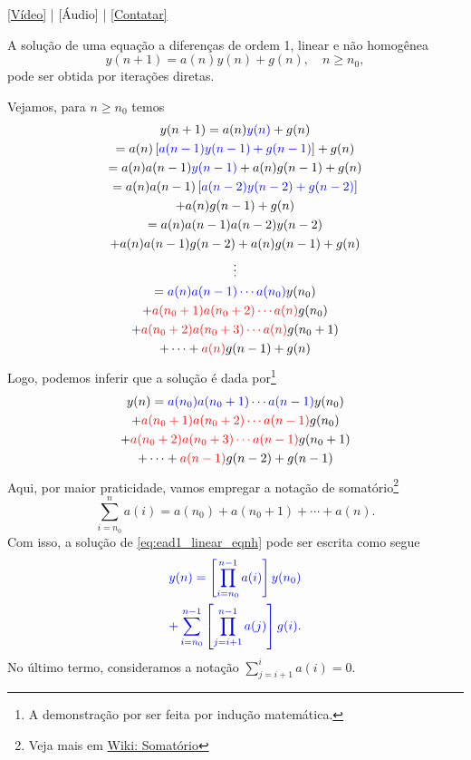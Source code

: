 \begin{flushright}
  \href{https://archive.org/details/ead-o1nh}{[Vídeo]} | [Áudio] | \href{https://phkonzen.github.io/notas/contato.html}{[Contatar]}
\end{flushright}

A solução de uma equação a diferenças de ordem 1, linear e não homogênea
\begin{equation}\label{eq:ead1_linear_eqnh}
  y(n+1) = a(n)y(n) + g(n),\quad n\geq n_0,
\end{equation}
pode ser obtida por iterações diretas.

Vejamos, para $n\geq n_0$ temos
\begin{gather}
  y(n+1) = a(n){\color{blue}y(n)} + g(n) \\
  = a(n)\left[{\color{blue}a(n-1)y(n-1)+g(n-1)}\right] + g(n) \\
  = a(n)a(n-1){\color{blue}y(n-1)}+a(n)g(n-1) + g(n) \\
  = a(n)a(n-1)\left[{\color{blue}a(n-2)y(n-2)+g(n-2)}\right] \nonumber\\
  + a(n)g(n-1) + g(n) \\
  = a(n)a(n-1)a(n-2)y(n-2) \nonumber\\
  + a(n)a(n-1)g(n-2) + a(n)g(n-1) + g(n) \\
  \vdots\nonumber\\
  = {\color{blue}a(n)a(n-1)\cdots a(n_0)}y(n_0) \nonumber\\
  + {\color{red}a(n_0+1)a(n_0+2)\cdots a(n)}g(n_0) \nonumber\\
  + {\color{red}a(n_0+2)a(n_0+3)\cdots a(n)}g(n_0+1) \nonumber\\
  + \cdots + {\color{red}a(n)}g(n-1) + g(n)
\end{gather}
Logo, podemos inferir que a solução é dada por\footnote{A demonstração por ser feita por indução matemática.}
\begin{gather}
  y(n) = {\color{blue}a(n_0)a(n_0+1)\cdots a(n-1)}y(n_0) \nonumber\\
  + {\color{red}a(n_0+1)a(n_0+2)\cdots a(n-1)}g(n_0) \nonumber\\
  + {\color{red}a(n_0+2)a(n_0+3)\cdots a(n-1)}g(n_0+1) \nonumber\\
  + \cdots + {\color{red}a(n-1)}g(n-2) + g(n-1)
\end{gather}
Aqui, por maior praticidade, vamos empregar a notação de somatório\footnote{Veja mais em \href{https://pt.wikipedia.org/wiki/Somat\%C3\%B3rio}{Wiki: Somatório}}
\begin{equation}
  \sum_{i=n_0}^{n} a(i) = a(n_0) + a(n_0+1) + \cdots + a(n).
\end{equation}
Com isso, a solução de \eqref{eq:ead1_linear_eqnh} pode ser escrita como segue
\begin{gather}
  {\color{blue}y(n) = \left[\prod_{i=n_0}^{n-1} a(i)\right]y(n_0)} \nonumber\\
  {\color{blue}+ \sum_{i=n_0}^{n-1}\left[\prod_{j=i+1}^{n-1} a(j)\right]g(i)}. \label{eq:ead1_linear_eqnh_sol}
\end{gather}
No último termo, consideramos a notação $\sum_{j=i+1}^i a(i) = 0$.

